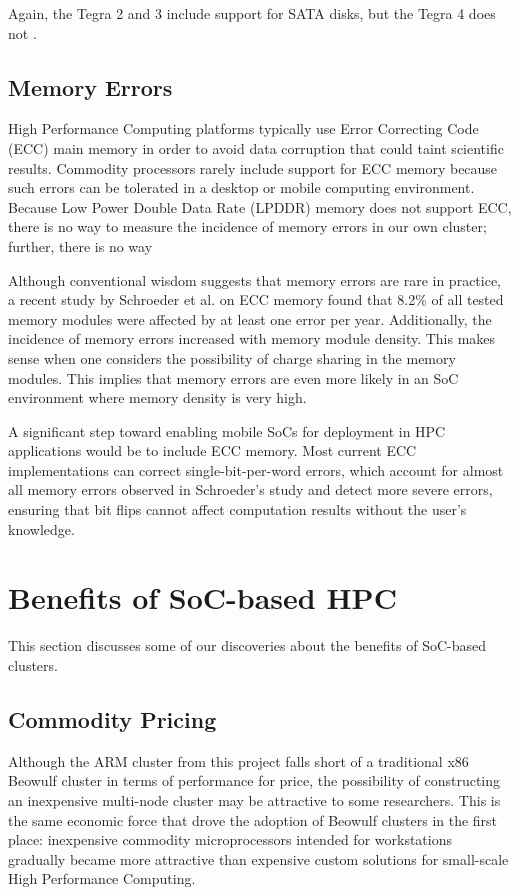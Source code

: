 \documentclass[11pt]{book}
\begin{document}
Again, the Tegra 2 and 3 include support for SATA disks, but the Tegra 4 does
not \cite{arstch-tegra}.

\subsection{\textbf{Memory Errors}}

High Performance Computing platforms typically use Error Correcting Code (ECC)
main memory in order to avoid data corruption that could taint scientific
results. Commodity processors rarely include support for ECC memory because such
errors can be tolerated in a desktop or mobile computing environment. Because
Low Power Double Data Rate (LPDDR) memory does not support ECC, there is no way
to measure the incidence of memory errors in our own cluster; further, there is
no way

Although conventional wisdom suggests that memory errors are rare in practice, a
recent study by Schroeder et al. \cite{schroeder-09} on ECC memory found that
8.2\% of all tested memory modules were affected by at least one error per
year. Additionally, the incidence of memory errors increased with memory module
density. This makes sense when one considers the possibility of charge sharing
in the memory modules. This implies that memory errors are even more likely in
an SoC environment where memory density is very high.

A significant step toward enabling mobile SoCs for deployment in HPC
applications would be to include ECC memory. Most current ECC implementations
can correct single-bit-per-word errors, which account for almost all memory
errors observed in Schroeder's study \cite{schroeder-09} and detect more severe
errors, ensuring that bit flips cannot affect computation results without the
user's knowledge.

\section{\textbf{Benefits of SoC-based HPC}}

This section discusses some of our discoveries about the benefits of SoC-based
clusters.

\subsection{\textbf{Commodity Pricing}}

Although the ARM cluster from this project falls short of a traditional x86
Beowulf cluster in terms of performance for price, the possibility of
constructing an inexpensive multi-node cluster may be attractive to some
researchers. This is the same economic force that drove the adoption of Beowulf
clusters in the first place: inexpensive commodity microprocessors intended for
workstations gradually became more attractive than expensive custom solutions
for small-scale High Performance Computing.
\end{document}
